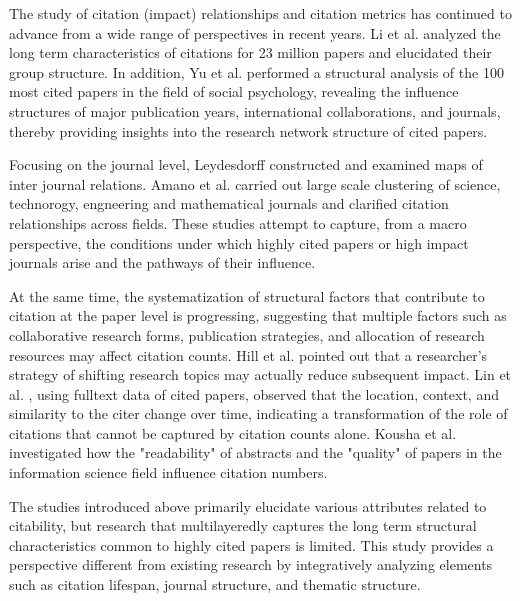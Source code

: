 The study of citation (impact) relationships and citation metrics has continued to advance from a wide range of perspectives in recent years. Li et al. \cite{Li1} analyzed the long term characteristics of citations for 23 million papers and elucidated their group structure. In addition, Yu et al. \cite{Yu1} performed a structural analysis of the 100 most cited papers in the field of social psychology, revealing the influence structures of major publication years, international collaborations, and journals, thereby providing insights into the research network structure of cited papers.

Focusing on the journal level, Leydesdorff \cite{Ley1,Ley2,Ley3,Ley4} constructed and examined maps of inter journal relations. Amano et al. \cite{Ama1,Ama2} carried out large scale clustering of science, technorogy, engneering and mathematical journals and clarified citation relationships across fields. These studies attempt to capture, from a macro perspective, the conditions under which highly cited papers or high impact journals arise and the pathways of their influence.

At the same time, the systematization of structural factors that contribute to citation at the paper level is progressing, suggesting that multiple factors such as collaborative research forms, publication strategies, and allocation of research resources may affect citation counts. Hill et al. \cite{Hil1} pointed out that a researcher's strategy of shifting research topics may actually reduce subsequent impact. Lin et al. \cite{Lin1}, using fulltext data of cited papers, observed that the location, context, and similarity to the citer change over time, indicating a transformation of the role of citations that cannot be captured by citation counts alone. Kousha et al. \cite{Ko1} investigated how the "readability" of abstracts and the "quality" of papers in the information science field influence citation numbers.  

The studies introduced above primarily elucidate various attributes related to citability, but research that multilayeredly captures the long term structural characteristics common to highly cited papers is limited. This study provides a perspective different from existing research by integratively analyzing elements such as citation lifespan, journal structure, and thematic structure.
